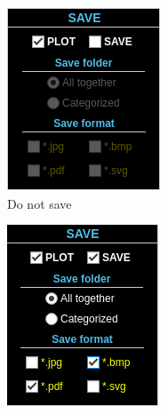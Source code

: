 \documentclass[11pt,a4paper,titlepage]{report}
\begin{document}
\begin{figure}[H]
    \centering
    \begin{subfigure}[H]{0.2\textwidth}
        \includegraphics[width=\textwidth]{save1.png}
        \caption{Do not save}
        \label{fig:savepanel0}
    \end{subfigure}
    \quad
    \begin{subfigure}[H]{0.2\textwidth}
        \includegraphics[width=\textwidth]{save2.png}

\end{subfigure}
\end{figure}
\end{document}
